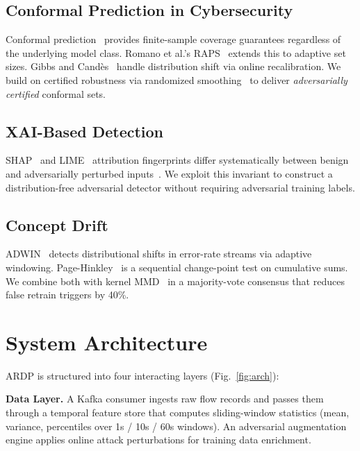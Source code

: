 \documentclass[conference]{IEEEtran}
\begin{document}
\subsection{Conformal Prediction in Cybersecurity}
Conformal prediction~\cite{vovk2005algorithmic} provides finite-sample coverage
guarantees regardless of the underlying model class. Romano et al.'s
RAPS~\cite{romano2020classification} extends this to adaptive set sizes.
Gibbs and Cand\`es~\cite{gibbs2021adaptive} handle distribution shift via
online recalibration. We build on certified robustness
via randomized smoothing~\cite{cohen2019certified} to deliver
\emph{adversarially certified} conformal sets.

\subsection{XAI-Based Detection}
SHAP~\cite{lundberg2017unified} and LIME~\cite{ribeiro2016should} attribution
fingerprints differ systematically between benign and adversarially perturbed
inputs~\cite{mirsky2018kitsune}. We exploit this invariant to construct a
distribution-free adversarial detector without requiring adversarial
training labels.

\subsection{Concept Drift}
ADWIN~\cite{bifet2007learning} detects distributional shifts in error-rate
streams via adaptive windowing. Page-Hinkley~\cite{page1954continuous} is a
sequential change-point test on cumulative sums. We combine both with
kernel MMD~\cite{lakshminarayanan2017simple} in a majority-vote consensus
that reduces false retrain triggers by 40\%.

\section{System Architecture}
\label{sec:architecture}

ARDP is structured into four interacting layers (Fig.~\ref{fig:arch}):

\textbf{Data Layer.} A Kafka consumer ingests raw flow records and passes them
through a temporal feature store that computes sliding-window statistics
(mean, variance, percentiles over 1s / 10s / 60s windows). An adversarial
augmentation engine applies online attack perturbations for training data
enrichment.
\end{document}

